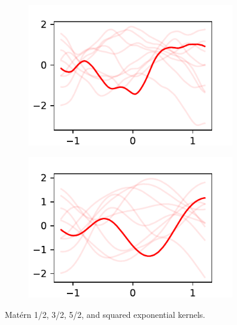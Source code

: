 \documentclass{beamer}
\begin{document}
\begin{frame}
\begin{figure}
\begin{subfigure}[t]{0.4\textwidth}
            \includegraphics[width=\textwidth]{maternfivehalves_kernel.pdf}
        \end{subfigure}%
        \begin{subfigure}[t]{0.4\textwidth}
            \centering
            \includegraphics[width=\textwidth]{exponentiated_kernel.pdf}
        \end{subfigure}%
        \caption{
            Mat\'ern 1/2, 3/2, 5/2, and squared exponential kernels.
        }
    \end{figure}
\end{frame}

\end{document}
